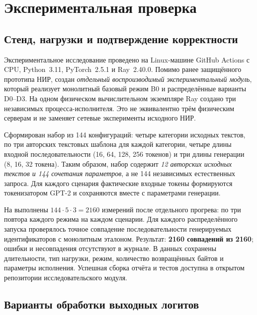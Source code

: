 \section{Экспериментальная проверка}

\subsection{Стенд, нагрузки и подтверждение корректности}

Экспериментальное исследование проведено на Linux-машине GitHub Actions с CPU, Python~3.11, PyTorch~2.5.1 и Ray~2.40.0. Помимо ранее защищённого прототипа НИР, создан \emph{отдельный воспроизводимый экспериментальный модуль}, который реализует монолитный базовый режим B0 и распределённые варианты D0--D3. На одном физическом вычислительном экземпляре Ray создано три независимых процесса-исполнителя. Это не эквивалентно трём физическим серверам и не заменяет сетевые эксперименты исходного НИР.

Сформирован набор из 144 конфигураций: четыре категории исходных текстов, по три авторских текстовых шаблона для каждой категории, четыре длины входной последовательности (16, 64, 128, 256 токенов) и три длины генерации (8, 16, 32 токена). Таким образом, набор содержит \emph{12 авторских исходных текстов и 144 сочетания параметров}, а не 144 независимых естественных запроса. Для каждого сценария фактические входные токены формируются токенизатором GPT-2 и сохраняются вместе с параметрами генерации.

На  выполнены $144\cdot 5\cdot 3=2160$ измерений после отдельного прогрева: по три повтора каждого режима на каждом сценарии. Для каждого распределённого запуска проверялось точное совпадение последовательности генерируемых идентификаторов с монолитным эталоном. Результат: \textbf{2160 совпадений из 2160}; ошибки и несовпадения отсутствуют в журнале. В данных сохранены длительности, тип нагрузки, режим, количество возвращённых байтов и параметры исполнения. Успешная сборка отчёта и тестов доступна в открытом репозитории исследовательского модуля.

\subsection{Варианты обработки выходных логитов}

